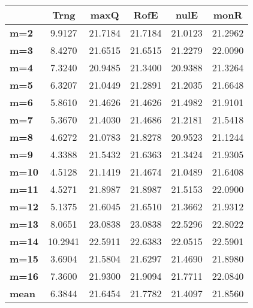 \begin{tabular}{|l|c|c|c|c|c|}
\hline
&\textbf{Trng}&\textbf{maxQ}&\textbf{RofE}&\textbf{nulE}&\textbf{monR}\\\hline
\textbf{m=2}&9.9127&21.7184&21.7184&21.0123&21.2962\\\hline
\textbf{m=3}&8.4270&21.6515&21.6515&21.2279&22.0090\\\hline
\textbf{m=4}&7.3240&20.9485&21.3400&20.9388&21.3264\\\hline
\textbf{m=5}&6.3207&21.0449&21.2891&21.2035&21.6648\\\hline
\textbf{m=6}&5.8610&21.4626&21.4626&21.4982&21.9101\\\hline
\textbf{m=7}&5.3670&21.4030&21.4686&21.2181&21.5418\\\hline
\textbf{m=8}&4.6272&21.0783&21.8278&20.9523&21.1244\\\hline
\textbf{m=9}&4.3388&21.5432&21.6363&21.3424&21.9305\\\hline
\textbf{m=10}&4.5128&21.1419&21.4674&21.0489&21.6408\\\hline
\textbf{m=11}&4.5271&21.8987&21.8987&21.5153&22.0900\\\hline
\textbf{m=12}&5.1375&21.6045&21.6510&21.3662&21.9312\\\hline
\textbf{m=13}&8.0651&23.0838&23.0838&22.5296&22.8022\\\hline
\textbf{m=14}&10.2941&22.5911&22.6383&22.0515&22.5901\\\hline
\textbf{m=15}&3.6904&21.5804&21.6297&21.4690&21.8980\\\hline
\textbf{m=16}&7.3600&21.9300&21.9094&21.7711&22.0840\\\hline
\textbf{mean}&6.3844&21.6454&21.7782&21.4097&21.8560\\\hline
\end{tabular}
